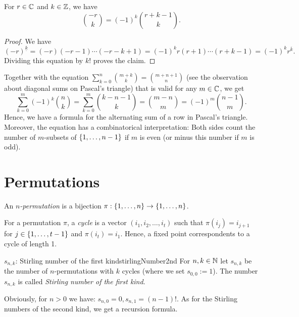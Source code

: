 \documentclass[language=english]{../../Template/TemplateLecture}
\begin{document}
\begin{prop}
    For $r \in \mathbb{C}$ and $k \in \mathbb{Z}$, we have 
    \begin{equation}
        \binom{-r}{k} = (-1)^k \binom{r+k-1}{k}.
    \end{equation}
\end{prop}

\begin{proof}
    We have
    \begin{equation}
        (-r)^{\underline{k}} = (-r)(-r-1)\cdots(-r-k+1) = (-1)^k r(r+1)\cdots(r+k-1) = (-1)^k r^{\overline{k}}.
    \end{equation}
    Dividing this equation by $k!$ proves the claim.
\end{proof}

\begin{bemerkung}
    Together with the equation $\sum_{k = 0}^n \binom{m+k}{k} = \binom{m + n + 1}{n}$ (see the observation about diagonal sums on Pascal's triangle) that is valid for any $m \in \mathbb{C}$, we get 
    \begin{equation}
        \sum_{k = 0}^m (-1)^k \binom{n}{k} = \sum_{k = 0}^m \binom{k - n - 1}{k} = \binom{m - n}{m} = (-1)^m \binom{n-1}{m}.
    \end{equation}
    Hence, we have a formula for the alternating sum of a row in Pascal's triangle. Moreover, the equation has a combinatorical interpretation: Both sides count the number of $m$-subsets of $\{1,\ldots,n-1\}$ if $m$ is even (or minus this number if $m$ is odd).
\end{bemerkung}

\section{Permutations}

An \emph{$n$-permutation} is a bijection $\pi: \{1,\ldots,n\} \to \{1,\ldots,n\}$.

For a permutation $\pi$, a \emph{cycle} is a vector $(i_1, i_2, \ldots, i_t)$ such that $\pi(i_j) = i_{j + 1}$ for $j \in \{1,\ldots,t-1\}$ and $\pi(i_t) = i_1$. Hence, a fixed point correspondents to a cycle of length 1.

\begin{defi}{$s_{n,k}$: Stirling number of the first kind}{stirlingNumber2nd}
    For $n, k \in \mathbb{N}$ let $s_{n,k}$ be the number of $n$-permutations with $k$ cycles (where we set $s_{0,0} := 1$). The number $s_{n,k}$ is called \emph{Stirling number of the first kind}.
\end{defi}
Obviously, for $n > 0$ we have: $s_{n,0} = 0, s_{n,1} = (n-1)!$. As for the Stirling numbers of the second kind, we get a recursion formula.
\end{document}
